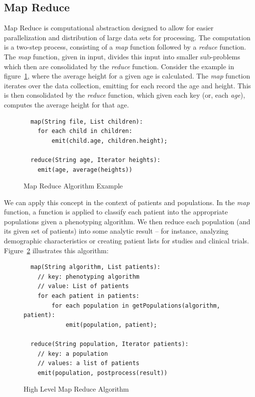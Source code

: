 \documentclass{amia}
\begin{document}
\subsection*{Map Reduce}
Map Reduce is computational abstraction designed to allow for easier parallelization and distribution of large data sets for processing\cite{dean2008mapreduce}. The computation is a two-step process, consisting of a \textit{map} function followed by a \textit{reduce} function. The \textit{map} function, given in input, divides this input into smaller sub-problems which then are consolidated by the \textit{reduce} function. Consider the example in figure~\ref{fig:map_reduce_example}, where the average height for a given age is calculated. The \textit{map} function iterates over the data collection, emitting for each record the age and height. This is then consolidated by the \textit{reduce} function, which given each key (or, each \textit{age}), computes the average height for that age.

\begin{figure}[H]
\begin{verbatim}
  map(String file, List children):
    for each child in children:
    	emit(child.age, children.height);

  reduce(String age, Iterator heights):
    emit(age, average(heights))
\end{verbatim}
\caption{Map Reduce Algorithm Example} 
\label{fig:map_reduce_example}
\end{figure}

We can apply this concept in the context of patients and populations. In the \textit{map} function, a function is applied to classify each patient into the appropriate populations given a phenotyping algorithm. We then reduce each population (and its given set of patients) into some analytic result -- for instance, analyzing demographic characteristics or creating patient lists for studies and clinical trials. Figure~\ref{fig:map_reduce_htp} illustrates this algorithm:

\begin{figure}[H]
\begin{verbatim}
  map(String algorithm, List patients):
    // key: phenotyping algorithm
    // value: List of patients
    for each patient in patients:
        for each population in getPopulations(algorithm, patient):
            emit(population, patient);

  reduce(String population, Iterator patients):
    // key: a population
    // values: a list of patients
    emit(population, postprocess(result))
\end{verbatim}
\caption{High Level Map Reduce Algorithm} 
\label{fig:map_reduce_htp}
\end{figure}
\end{document}
